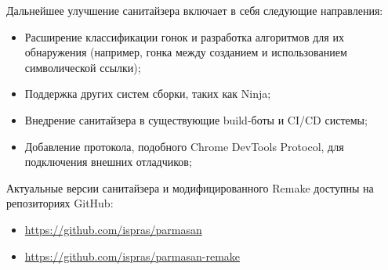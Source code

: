 Дальнейшее улучшение санитайзера включает в себя следующие направления:

\begin{itemize}
    \item Расширение классификации гонок и разработка алгоритмов для их обнаружения (например, гонка между созданием и использованием символической ссылки);
    \item Поддержка других систем сборки, таких как Ninja;
    \item Внедрение санитайзера в существующие build-боты и CI/CD системы;
    \item Добавление протокола, подобного Chrome DevTools Protocol, для подключения внешних отладчиков;
\end{itemize}

Актуальные версии санитайзера и модифицированного Remake доступны на репозиториях GitHub:

\begin{itemize}
    \item \url{https://github.com/ispras/parmasan}
    \item \url{https://github.com/ispras/parmasan-remake}
\end{itemize}
